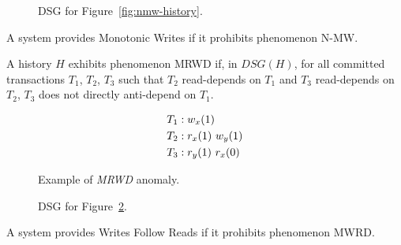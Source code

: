 \begin{figure}[H]
\centering
{}
\caption{DSG for Figure~\ref{fig:nmw-history}.}
\label{fig:nmw-dsg}
\end{figure}


\begin{definition}
A system provides Monotonic Writes if it prohibits phenomenon N-MW.
\end{definition}

\begin{definition}
A history $H$ exhibits phenomenon MRWD if, in $DSG(H)$, for all
committed transactions $T_1$, $T_2$, $T_3$ such that $T_2$
read-depends on $T_1$ and $T_3$ read-depends on $T_2$, $T_3$ does
not directly anti-depend on $T_1$.
\end{definition}


\begin{figure}[H]
\begin{align*}
\small
T_1 &: w_x(1)\\
T_2 &: r_x(1)~w_y(1)\\
T_3 &: r_y(1)~r_x(0)
\end{align*}
\caption{Example of \textit{MRWD} anomaly.}
\label{fig:nwfr-history}
\end{figure}

\begin{figure}[H]
\centering
{}
\caption{DSG for Figure~\ref{fig:nwfr-history}.}
\label{fig:nwfr-dsg}
\end{figure}

\begin{definition}
A system provides Writes Follow Reads if it prohibits phenomenon MWRD.
\end{definition}

